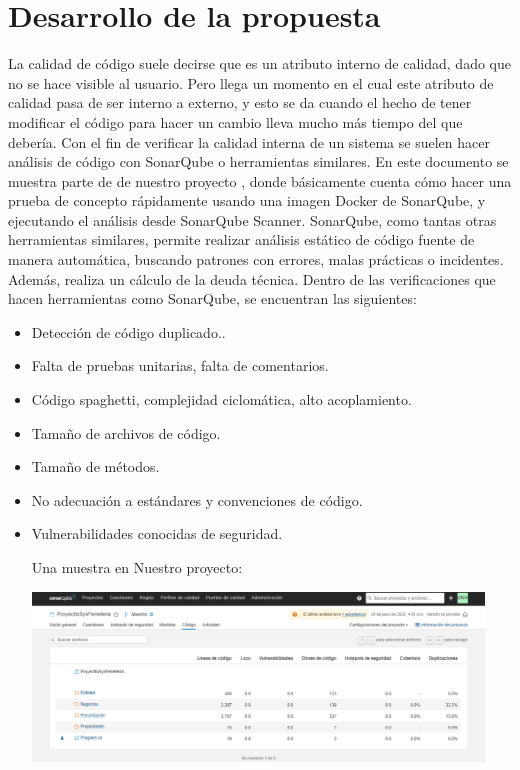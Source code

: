 \documentclass[preprint,12pt]{elsarticle}
\begin{document}
\section{Desarrollo de la propuesta}
La calidad de código suele decirse que es un atributo interno de calidad, dado que no se hace visible al usuario. Pero llega un momento en el cual este atributo de calidad pasa de ser interno a externo, y esto se da cuando el hecho de tener modificar el código para hacer un cambio lleva mucho más tiempo del que debería. Con el fin de verificar la calidad interna de un sistema se suelen hacer análisis de código con SonarQube o herramientas similares. En este documento se muestra parte de de nuestro proyecto , donde básicamente  cuenta cómo hacer una prueba de concepto rápidamente usando una imagen Docker de SonarQube, y ejecutando el análisis desde SonarQube Scanner.
SonarQube, como tantas otras herramientas similares, permite realizar análisis estático de código fuente de manera automática, buscando patrones con errores, malas prácticas o incidentes. Además, realiza un cálculo de la deuda técnica. Dentro de las verificaciones que hacen herramientas como SonarQube, se encuentran las siguientes:
\begin{itemize}
	\item Detección de código duplicado..
	\item Falta de pruebas unitarias, falta de comentarios. 
	\item Código spaghetti, complejidad ciclomática, alto acoplamiento.
	\item Tamaño de archivos de código.
	\item Tamaño de métodos.
	\item No adecuación a estándares y convenciones de código.
	\item Vulnerabilidades conocidas de seguridad.
	
	Una muestra en Nuestro proyecto:
		
        \begin{center}
	\includegraphics[width=12cm]{./imagen/7} 
	\end{center}
\end{itemize}
\end{document}
